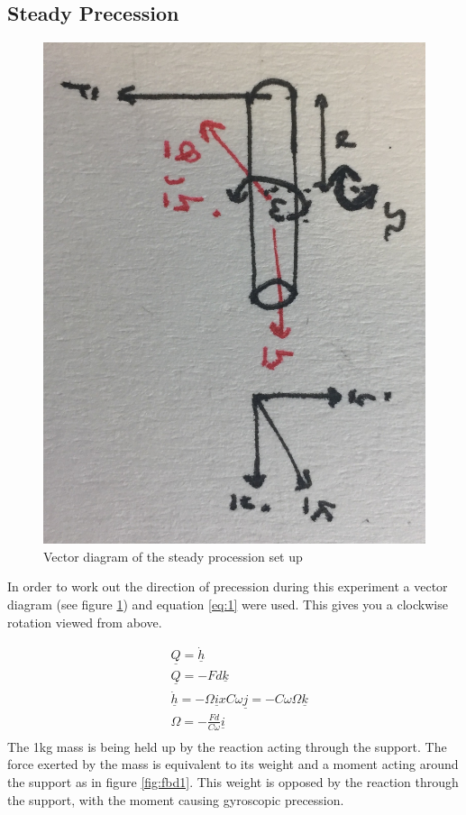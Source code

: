 \documentclass[twoside,twocolumn]{article}
\begin{document}
\subsection{Steady Precession}
\begin{figure}[h]
  \centering
    \includegraphics[width=\linewidth]{SPVector}
  \caption{Vector diagram of the steady procession set up}
  \label{fig:spvector}
\end{figure}

In order to work out the direction of precession during this experiment a vector diagram (see figure \ref{fig:spvector}) and equation \ref{eq:1} were used. This gives you a clockwise rotation viewed from above.

\begin{equation}
\label{eq:1}
\begin{split}
&\underline{Q} = \underline{\dot{h}} \\
&\underline{Q} = -Fd\underline{k}\\
&\underline{\dot{h}}=-\Omega\underline{i}xC\omega\underline{j}=-C\omega\Omega\underline{k}\\
&\Omega=-\frac{Fd}{C\omega}\underline{i}\\
\end{split}
\end{equation} 
The 1kg mass is being held up by the reaction acting through the support. The force exerted by the mass is equivalent to its weight and a moment acting around the support as in figure \ref{fig:fbd1}. This weight is opposed by the reaction through the support, with the moment causing gyroscopic precession.
\end{document}
